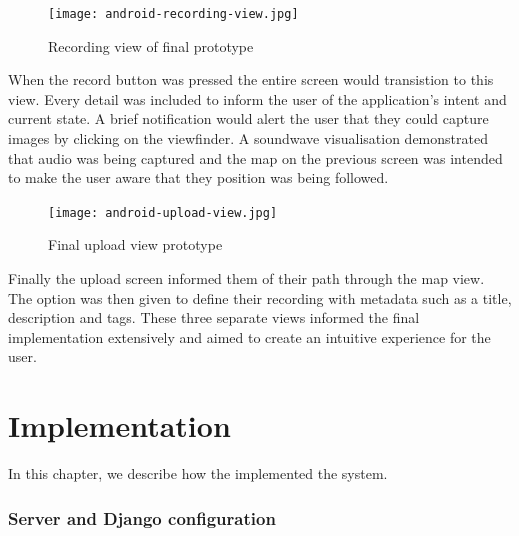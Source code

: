 \documentclass{l3proj}
\begin{document}
\begin{figure}[ht!]
\centering
\texttt{[image: android-recording-view.jpg]}
\caption{Recording view of final prototype}
\label{overflow}
\end{figure}

When the record button was pressed the entire screen would transistion to this view. Every detail was included to inform the user of the application's intent and current state. A brief notification would alert the user that they could capture images by clicking on the viewfinder. A soundwave visualisation demonstrated that audio was being captured and the map on the previous screen was intended to make the user aware that they position was being followed.

\begin{figure}[ht!]
\centering
\texttt{[image: android-upload-view.jpg]}
\caption{Final upload view prototype}
\label{overflow}
\end{figure}

Finally the upload screen informed them of their path through the map view. The option was then given to define their recording with metadata such as a title, description and tags. These three separate views informed the final implementation extensively and aimed to create an intuitive experience for the user.
\chapter{Implementation}
\label{impl}

In this chapter, we describe how the implemented the system.

\subsection{Server and Django configuration}
\end{document}
